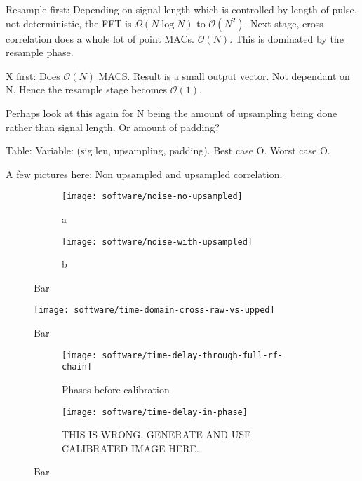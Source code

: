 Resample first:
Depending on signal length which is controlled by length of pulse, not deterministic, the FFT is \(\Omega(N\log{N})\) to \(\mathcal{O}(N^2)\). Next stage, cross correlation does a whole lot of point MACs. \(\mathcal{O}(N)\). This is dominated by the resample phase. 

X first: Does \(\mathcal{O}(N)\) MACS. Result is a small output vector. Not dependant on N. Hence the resample stage becomes \(\mathcal{O}(1)\). 

Perhaps look at this again for N being the amount of upsampling being done rather than signal length. Or amount of padding?

Table: Variable: (sig len, upsampling, padding). Best case O. Worst case O. 

A few pictures here:
Non upsampled and upsampled correlation.
\begin{figure}
  \centering
  \begin{subfigure}[b]{0.49\textwidth}
    \centering
    \texttt{[image: software/noise-no-upsampled]}
    \caption{a}
  \end{subfigure}
  \begin{subfigure}[b]{0.49\textwidth}
    \centering
    \texttt{[image: software/noise-with-upsampled]}
    \caption{b}
  \end{subfigure}
  \caption{Bar}
\end{figure}

\begin{figure}
  \centering
  \texttt{[image: software/time-domain-cross-raw-vs-upped]}
  \caption{Bar}
  \label{fig:software-aseaweawea}
\end{figure}

\begin{figure}
  \centering
  \begin{subfigure}[b]{0.49\textwidth}
    \centering
    \texttt{[image: software/time-delay-through-full-rf-chain]}
    \caption{Phases before calibration}
  \end{subfigure}
  \begin{subfigure}[b]{0.49\textwidth}
    \centering
    \texttt{[image: software/time-delay-in-phase]}
    \caption{THIS IS WRONG. GENERATE AND USE CALIBRATED IMAGE HERE.}
  \end{subfigure}
  \caption{Bar}
\end{figure}

